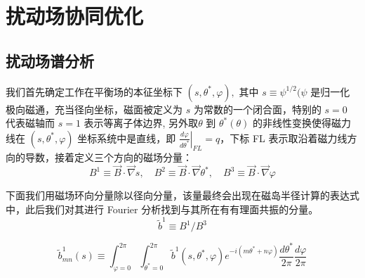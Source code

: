 \chapter{扰动场协同优化}

\section{扰动场谱分析}
我们首先确定工作在平衡场的本征坐标下 $\left(s, \theta^{*}, \varphi\right),$ 其中 $s \equiv \psi^{1 / 2}(\psi$ 是归一化极向磁通，充当径向坐标，磁面被定义为 $s$ 为常数的一个闭合面，特别的 $s=0$ 代表磁轴而 $s=1$ 表示等离子体边界, 另外取$\theta$ 到 $\theta^{*}(\theta)$ 的非线性变换使得磁力线在 $\left(s, \theta^{*}, \varphi\right)$ 坐标系统中是直线，即 $\left.\frac{d \varphi}{d \theta^{*}}\right|_{F L}=q$，下标 FL 表示取沿着磁力线方向的导数，接着定义三个方向的磁场分量：
\begin{equation}
B^{1} \equiv \vec{B} \cdot \vec{\nabla} s, \quad
B^{2} \equiv \vec{B} \cdot \vec{\nabla} \theta^{*}, \quad
B^{3} \equiv \vec{B} \cdot \vec{\nabla} \varphi
\label{de:B-comp}
\end{equation}

下面我们用磁场环向分量除以径向分量，该量最终会出现在磁岛半径计算的表达式中，此后我们对其进行 Fourier 分析找到与其所在有有理面共振的分量。
\begin{equation}
  \tilde{b}^{1} \equiv B^{1} / B^{3}
\end{equation}


\begin{equation}
  \tilde{b}_{m n}^{1}(s) \equiv \int_{\varphi=0}^{2 \pi} \int_{\theta^{*}=0}^{2 \pi} \tilde{b}^{1}\left(s, \theta^{*}, \varphi\right) e^{-i\left(m \theta^{*}+n \varphi\right)} \frac{d \theta^{*}}{2 \pi} \frac{d \varphi}{2 \pi}
\end{equation}

